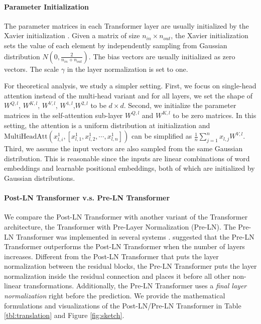 \documentclass{article}
\begin{document}
\paragraph{Parameter Initialization}
The parameter matrices in each Transformer layer are usually initialized by the Xavier initialization \citep{glorot2010understanding}. Given a matrix of size $n_{in}\times n_{out}$, the Xavier initialization sets the value of each element by independently sampling from Gaussian distribution $N(0, \frac{2}{n_{in}+n_{out}})$. The bias vectors are usually initialized as zero vectors. The scale $\gamma$ in the layer normalization is set to one. 

For theoretical analysis, we study a simpler setting. First, we focus on single-head attention instead of the multi-head variant and for all layers, we set the shape of $W^{Q,l}$, $W^{K,l}$, $W^{V,l}$, $W^{1,l}$,$W^{2,l}$ to be $d\times d$. Second, we initialize the parameter matrices in the self-attention sub-layer $W^{Q,l}$ and $W^{K,l}$ to be zero matrices. In this setting, the attention is a uniform distribution at initialization and $\text{MultiHeadAtt}(x_{l, i}^1,[ x_{l, 1}^1, x_{l, 2}^1,\cdots, x_{l, n}^1])$ can be simplified as $\frac{1}{n}\sum_{j=1}^{n}x_{l, j} W^{V, l}$. Third, we assume the input vectors are also sampled from the same Gaussian distribution. This is reasonable since the inputs are linear combinations of word embeddings and learnable positional embeddings, both of which are initialized by Gaussian distributions. 

\paragraph{Post-LN Transformer v.s. Pre-LN Transformer}
We compare the Post-LN Transformer with another variant of the Transformer architecture, the Transformer with Pre-Layer Normalization (Pre-LN). The Pre-LN Transformer was implemented in several systems \citep{tensor2tensor, klein2018opennmt,liu2019roberta}. \citet{wang2019learning} suggested that the Pre-LN Transformer outperforms the Post-LN Transformer when the number of layers increases. Different from the Post-LN Transformer that puts the layer normalization between the residual blocks, the Pre-LN Transformer puts the layer normalization inside the residual connection and places it before all other non-linear transformations. Additionally, the Pre-LN Transformer uses a \emph{final layer normalization} right before the prediction. We provide the mathematical formulations and visualizations of the Post-LN/Pre-LN Transformer in Table \ref{tbl:translation} and Figure \ref{fig:sketch}. 
\end{document}
